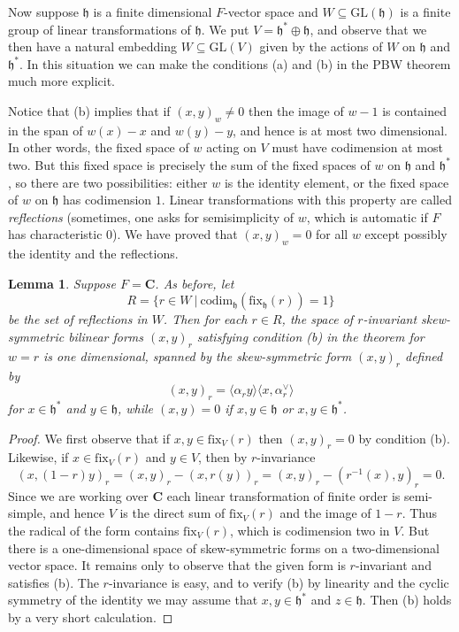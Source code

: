 \documentclass[12pt, reqno]{amsart}
\numberwithin{equation}{section}
\theoremstyle{definition}
\theoremstyle{plain}
\newtheorem{lemma}[theorem]{Lemma}
\newcommand{\CC}{\mathbf{C}}
\newcommand{\hh}{\mathfrak{h}}
\newcommand{\la}{\langle}
\newcommand{\ra}{\rangle}
\begin{document}
Now suppose $\hh$ is a finite dimensional $F$-vector space and $W \subseteq \mathrm{GL}(\hh)$ is a finite group of linear transformations of $\hh$. We put $V=\hh^* \oplus \hh$, and observe that we then have a natural embedding $W \subseteq \mathrm{GL}(V)$ given by the actions of $W$ on $\hh$ and $\hh^*$. In this situation we can make the conditions (a) and (b) in the PBW theorem much more explicit.

Notice that (b) implies that if $(x,y)_w \neq 0$ then the image of $w-1$ is contained in the span of $w(x)-x$ and $w(y)-y$, and hence is at most two dimensional. In other words, the fixed space of $w$ acting on $V$ must have codimension at most two. But this fixed space is precisely the sum of the fixed spaces of $w$ on $\hh$ and $\hh^*$, so there are two possibilities: either $w$ is the identity element, or the fixed space of $w$ on $\hh$ has codimension $1$. Linear transformations with this property are called \emph{reflections} (sometimes, one asks for semisimplicity of $w$, which is automatic if $F$ has characteristic $0$). We have proved that $(x,y)_w=0$ for all $w$ except possibly the identity and the reflections.

\begin{lemma}
Suppose $F=\CC$. As before, let
$$R=\{r \in W \ | \ \mathrm{codim}_\hh(\mathrm{fix}_{\hh}(r))=1 \}$$ be the set of reflections in $W$. Then for each $r \in R$, the space of $r$-invariant skew-symmetric bilinear forms $(x,y)_r$ satisfying condition (b) in the theorem for $w=r$ is one dimensional, spanned by the skew-symmetric form $(x,y)_r$ defined by
$$(x,y)_r=\la \alpha_r y \ra \la x, \alpha_r^\vee \ra$$ for $x \in \hh^*$ and $y \in \hh$, while $(x,y)=0$ if $x,y \in \hh$ or $x,y \in \hh^*$.
\end{lemma}
\begin{proof}
We first observe that if $x,y \in \mathrm{fix}_V(r)$ then $(x,y)_r=0$ by condition (b). Likewise, if $x \in \mathrm{fix}_V(r)$ and $y \in V$, then by $r$-invariance
$$(x,(1-r)y)_r=(x,y)_r-(x,r(y))_r=(x,y)_r-(r^{-1}(x),y)_r=0.$$ Since we are working over $\CC$ each linear transformation of finite order is semi-simple, and hence $V$ is the direct sum of $\mathrm{fix}_V(r)$ and the image of $1-r$. Thus the radical of the form contains $\mathrm{fix}_V(r)$, which is codimension two in $V$. But there is a one-dimensional space of skew-symmetric forms on a two-dimensional vector space. It remains only to observe that the given form is $r$-invariant and satisfies (b). The $r$-invariance is easy,  and to verify (b) by linearity and the cyclic symmetry of the identity we may assume that $x,y \in \hh^*$ and $z \in \hh$. Then (b) holds by a very short calculation. 
\end{proof}
\end{document}
